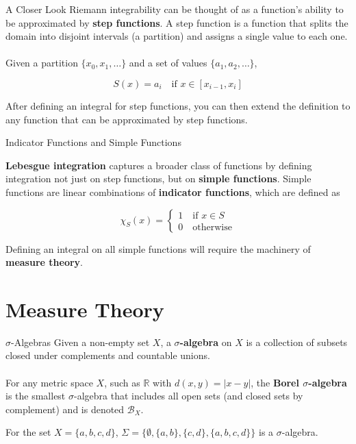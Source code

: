 \documentclass{beamer}
\begin{document}
\begin{frame}{A Closer Look}
    Riemann integrability can be thought of as a function's ability
    to be approximated by \textbf{step functions}. A step function
    is a function that splits the domain into disjoint intervals
    (a partition) and 
    assigns a single value to each one.\\~\\
    Given a partition $\{x_0, x_1, \ldots\}$ and a set of values $\{a_1, a_2, \ldots\}$,

    \[
        S(x) = a_i\quad\text{if $x \in [x_{i-1}, x_i]$}
    \]

    After defining an integral for step functions, you can
    then extend the definition to any function that can be approximated
    by step functions.

\end{frame}
\begin{frame}{Indicator Functions and Simple Functions}

    \textbf{Lebesgue integration} captures a broader class of functions
    by defining integration not just on step functions, but on 
    \textbf{simple functions}. Simple functions are linear combinations
    of \textbf{indicator functions}, which are defined as 

    \[
        \chi_S(x) = \begin{cases}
            1\quad\text{if $x \in S$}\\
            0\quad\text{otherwise}
        \end{cases}  
    \]
    
    Defining an integral on all simple functions will
    require the machinery of \textbf{measure theory}.
\end{frame}

\section{Measure Theory}

\begin{frame}{$\sigma$-Algebras}
    Given a non-empty set $X$, a \textbf{$\sigma$-algebra} on $X$ is a collection 
    of subsets closed under complements and countable unions. \\~\\
    For any metric space $X$, 
    such as $\mathbb{R}$ with $d(x,y) = |x-y|$, the 
    \textbf{Borel $\sigma$-algebra} is the smallest $\sigma$-algebra
    that includes all open sets (and closed sets by complement) and is denoted $\mathcal{B}_X$.
    \begin{example}
        For the set $X = \{a,b,c,d\}$, $\Sigma = \{\emptyset, \{a,b\}, \{c,d\}, \{a,b,c,d\}\}$
        is a $\sigma$-algebra. 
    \end{example}
\end{frame}
\end{document}
